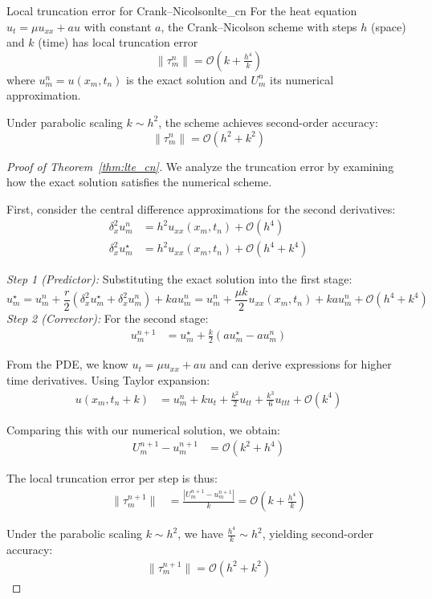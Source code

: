 \begin{theorem}{Local truncation error for Crank--Nicolson}{lte_cn}
  For the heat equation $u_t = \mu u_{xx} + au$ with constant $a$, the Crank--Nicolson scheme with steps $h$ (space) and $k$ (time) has local truncation error
  \[
    \|\tau_m^n\| = \mathcal{O}\!\left(k +\tfrac{h^4}{k}\right)
  \]
  where $u_m^n = u(x_m,t_n)$ is the exact solution and $U_m^n$ its numerical approximation.

  Under parabolic scaling $k \sim h^2$, the scheme achieves second-order accuracy:
  \[
    \|\tau_m^n\| = \mathcal{O}\!\left(h^2 + k^2\right)
  \]
\end{theorem}

\begin{proof}[Proof of Theorem~\ref{thm:lte_cn}]
  We analyze the truncation error by examining how the exact solution satisfies the numerical scheme.

  First, consider the central difference approximations for the second derivatives:
  \begin{align*}
    \delta_x^2 u_m^n     & = h^2u_{xx}(x_m,t_n) + \mathcal{O}(h^4)       \\
    \delta_x^2 u_m^\star & = h^2u_{xx}(x_m,t_n) + \mathcal{O}(h^4 + k^4)
  \end{align*}

  \textit{Step 1 (Predictor):} Substituting the exact solution into the first stage:
  \begin{equation}
    u_m^\star = u_m^n + \frac{r}{2}\left(\delta_x^2 u_m^\star + \delta_x^2 u_m^n\right) + kau_m^n = u_m^n + \frac{\mu k}{2}u_{xx}(x_m,t_n) + kau_m^n + \mathcal{O}(h^4 + k^4)
  \end{equation}
  \textit{Step 2 (Corrector):} For the second stage:
  \begin{align*}
    u_m^{n+1} & = u_m^\star + \frac{k}{2}(au_m^\star - au_m^n)
  \end{align*}

  From the PDE, we know $u_t = \mu u_{xx} + au$ and can derive expressions for higher time derivatives. Using Taylor expansion:
  \begin{align*}
    u(x_m,t_n+k) & = u_m^n + ku_t + \frac{k^2}{2}u_{tt} + \frac{k^3}{6}u_{ttt} + \mathcal{O}(k^4)
  \end{align*}

  Comparing this with our numerical solution, we obtain:
  \begin{align*}
    U_m^{n+1} - u_m^{n+1} & = \mathcal{O}(k^2 + h^4)
  \end{align*}

  The local truncation error per step is thus:
  \begin{align*}
    \|\tau_m^{n+1}\| & = \frac{|U_m^{n+1} - u_m^{n+1}|}{k} = \mathcal{O}\left(k + \frac{h^4}{k}\right)
  \end{align*}

  Under the parabolic scaling $k \sim h^2$, we have $\frac{h^4}{k} \sim h^2$, yielding second-order accuracy:
  \begin{align*}
    \|\tau_m^{n+1}\| = \mathcal{O}(h^2 + k^2)
  \end{align*}
\end{proof}
